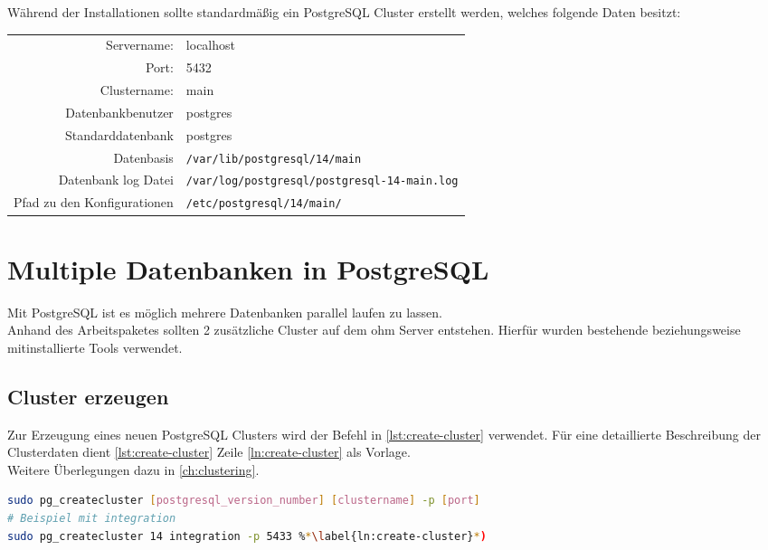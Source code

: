Während der Installationen sollte standardmäßig ein PostgreSQL Cluster\cite{postgresql-cluster} erstellt werden, welches folgende Daten besitzt:\\[0.5cm]
\begin{tabular}{r l}
	Servername: & localhost\\
	Port: & 5432\\
	Clustername: & main\\
	Datenbankbenutzer & postgres\\
	Standarddatenbank & postgres\\
	Datenbasis & \lstinline[language=bash]|/var/lib/postgresql/14/main|\\
	Datenbank log Datei & \lstinline[language=bash]|/var/log/postgresql/postgresql-14-main.log|\\
	Pfad zu den Konfigurationen & \lstinline[language=bash]|/etc/postgresql/14/main/|\\
\end{tabular}

\newpage
\section{Multiple Datenbanken in PostgreSQL}
Mit PostgreSQL ist es möglich mehrere Datenbanken parallel laufen zu lassen.\cite[132 ff.]{postgres14:cookbook}\\
Anhand des Arbeitspaketes sollten 2 zusätzliche Cluster\cite{postgresql-cluster} auf dem \gls{ohm} Server entstehen. Hierfür wurden bestehende beziehungsweise mitinstallierte Tools verwendet.

\subsection{Cluster erzeugen}\label{subsec:create-cluster}
Zur Erzeugung eines neuen PostgreSQL Clusters\cite{postgresql-cluster} wird der Befehl in \autoref{lst:create-cluster} verwendet. Für eine detaillierte Beschreibung der Clusterdaten dient \autoref{lst:create-cluster} Zeile \ref{ln:create-cluster} als Vorlage.\\ Weitere Überlegungen dazu in \autoref{ch:clustering}.
\begin{lstlisting}[language=bash,caption={Erzeugung eines PostgreSQL Clusters},label={lst:create-cluster}]
sudo pg_createcluster [postgresql_version_number] [clustername] -p [port]
# Beispiel mit integration
sudo pg_createcluster 14 integration -p 5433 %*\label{ln:create-cluster}*)
\end{lstlisting}

